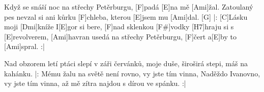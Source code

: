 
\sloka
[Ami]Když se snáší noc na střechy Petěrburgu, [F]padá [E]na mě [Ami]žal.
Zatoulaný pes nevzal si ani kůrku [F]chleba, kterou [E]jsem mu [Ami]dal. [G]
|: [C]Lásku moji [Dmi]kníže I[E]gor si bere,
[F]nad sklenkou [F#\dim]vodky [H7]hraju si s [E]revolverem,
[Ami]havran usedá na střechy Petěrburgu, [F]čert a[E]by to [Ami]spral. :|

\sloka
Nad obzorem letí ptáci slepí v záři červánků,
moje duše, široširá stepi, máš na kahánku.
|: Mému žalu na světě není rovno,
vy jste tím vinna, Naděždo Ivanovno,
vy jste tím vinna, až mě zítra najdou s dírou ve spánku. :|
